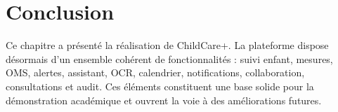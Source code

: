 \section*{Conclusion}
Ce chapitre a présenté la réalisation de ChildCare+. La plateforme dispose désormais d'un ensemble cohérent de fonctionnalités : suivi enfant, mesures, OMS, alertes, assistant, OCR, calendrier, notifications, collaboration, consultations et audit. Ces éléments constituent une base solide pour la démonstration académique et ouvrent la voie à des améliorations futures.
